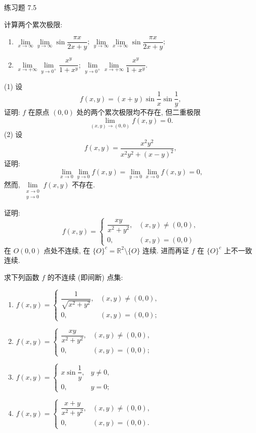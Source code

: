 \begin{exblock}{练习题 7.5}
  \item 计算两个累次极限:
  \begin{enumerate}
    \item $\lim\limits_{x \to \infty} \lim\limits_{y \to \infty} \sin\dfrac{\pi x}{2x + y}$; \quad $\lim\limits_{y \to \infty} \lim\limits_{x \to \infty} \sin\dfrac{\pi x}{2x + y}$;
    \item $\lim\limits_{x \to +\infty} \lim\limits_{y \to 0^{+}} \dfrac{x^{y}}{1 + x^{y}}$; \quad $\lim\limits_{y \to 0^{+}} \lim\limits_{x \to +\infty} \dfrac{x^{y}}{1 + x^{y}}$.
  \end{enumerate}

  \item (1) 设
  \[
    f(x, y) = (x + y)\sin\frac{1}{x}\sin\frac{1}{y},
  \]
  证明: $f$ 在原点 $(0, 0)$ 处的两个累次极限均不存在, 但二重极限
  \[
    \lim_{(x, y) \to (0, 0)} f(x, y) = 0.
  \]
  (2) 设
  \[
    f(x, y) = \frac{x^{2}y^{2}}{x^{2}y^{2} + (x - y)^{2}},
  \]
  证明:
  \[
    \lim_{x \to 0} \lim_{y \to 0} f(x, y) = \lim_{y \to 0} \lim_{x \to 0} f(x, y) = 0,
  \]
  然而, $\lim\limits_{\substack{x \to 0 \\ y \to 0}} f(x, y)$ 不存在.

  \item 证明:
  \[
    f(x, y) =
    \begin{cases}
      \dfrac{xy}{x^{2} + y^{2}}, & (x, y) \neq (0, 0), \\[2.5mm]
      0, & (x, y) = (0, 0)
    \end{cases}
  \]
  在 $O(0, 0)$ 点处不连续, 在 $\{O\}^{c} = \mathbb{R}^{2} \setminus \{O\}$ 连续. 进而再证 $f$ 在 $\{O\}^{c}$ 上不一致连续.

  \item 求下列函数 $f$ 的不连续 (即间断) 点集:
  \begin{enumerate}
    \item $f(x, y) =
      \begin{cases}
        \dfrac{1}{\sqrt{x^{2} + y^{2}}}, & (x, y) \neq (0, 0), \\[2.5mm]
        0, & (x, y) = (0, 0);
      \end{cases}$
    \item $f(x, y) =
      \begin{cases}
        \dfrac{xy}{x^{2} + y^{2}}, & (x, y) \neq (0, 0), \\[2.5mm]
        0, & (x, y) = (0, 0);
      \end{cases}$
    \item $f(x, y) =
      \begin{cases}
        x\sin\dfrac{1}{y}, & y \neq 0, \\[2.5mm]
        0, & y = 0;
      \end{cases}$
    \item $f(x, y) =
      \begin{cases}
        \dfrac{x + y}{x^{2} + y^{2}}, & (x, y) \neq (0, 0), \\[2.5mm]
        0, & (x, y) = (0, 0).
      \end{cases}$
  \end{enumerate}


\end{exblock}
